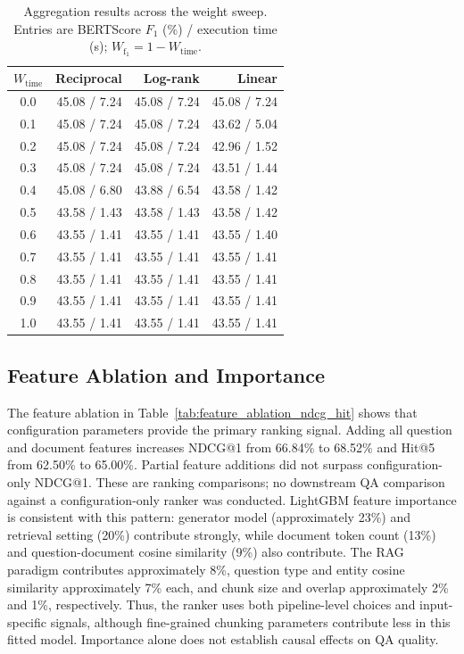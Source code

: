 \begin{table}[tb]
\centering\small
\caption{Aggregation results across the weight sweep. Entries are BERTScore $F_1$ (\%) / execution time (s); $W_{\mathrm{f_1}}=1-W_{\mathrm{time}}$.}
\label{tab:weight_sweep_ablation}
\setlength{\tabcolsep}{3pt}
\begin{tabular}{crrr}
\toprule
$W_{\mathrm{time}}$ & Reciprocal & Log-rank & Linear \\
\midrule
0.0 & 45.08 / 7.24 & 45.08 / 7.24 & 45.08 / 7.24 \\
0.1 & 45.08 / 7.24 & 45.08 / 7.24 & 43.62 / 5.04 \\
0.2 & 45.08 / 7.24 & 45.08 / 7.24 & 42.96 / 1.52 \\
0.3 & 45.08 / 7.24 & 45.08 / 7.24 & 43.51 / 1.44 \\
0.4 & 45.08 / 6.80 & 43.88 / 6.54 & 43.58 / 1.42 \\
0.5 & 43.58 / 1.43 & 43.58 / 1.43 & 43.58 / 1.42 \\
0.6 & 43.55 / 1.41 & 43.55 / 1.41 & 43.55 / 1.40 \\
0.7 & 43.55 / 1.41 & 43.55 / 1.41 & 43.55 / 1.41 \\
0.8 & 43.55 / 1.41 & 43.55 / 1.41 & 43.55 / 1.41 \\
0.9 & 43.55 / 1.41 & 43.55 / 1.41 & 43.55 / 1.41 \\
1.0 & 43.55 / 1.41 & 43.55 / 1.41 & 43.55 / 1.41 \\
\bottomrule
\end{tabular}
\end{table}

\subsection{Feature Ablation and Importance} \label{feature-analysis}\label{sec5.5}\label{sec5.6}
The feature ablation in Table~\ref{tab:feature_ablation_ndcg_hit} shows that configuration parameters provide the primary ranking signal. Adding all question and document features increases NDCG@1 from 66.84\% to 68.52\% and Hit@5 from 62.50\% to 65.00\%. Partial feature additions did not surpass configuration-only NDCG@1. These are ranking comparisons; no downstream QA comparison against a configuration-only ranker was conducted. LightGBM feature importance is consistent with this pattern: generator model (approximately 23\%) and retrieval setting (20\%) contribute strongly, while document token count (13\%) and question-document cosine similarity (9\%) also contribute. The RAG paradigm contributes approximately 8\%, question type and entity cosine similarity approximately 7\% each, and chunk size and overlap approximately 2\% and 1\%, respectively. Thus, the ranker uses both pipeline-level choices and input-specific signals, although fine-grained chunking parameters contribute less in this fitted model. Importance alone does not establish causal effects on QA quality.

